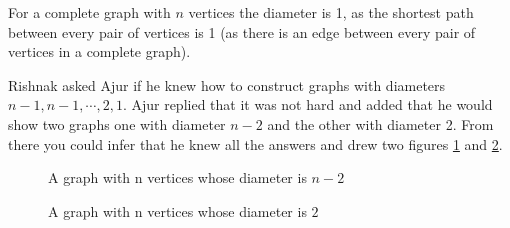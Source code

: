 For a complete graph with $n$ vertices the diameter is 1, as the shortest path between every pair of vertices is 1 (as there is an edge between every pair of vertices in a complete graph). 

Rishnak asked Ajur if he knew how to construct graphs with diameters $n-1, n-1, \cdots, 2, 1$. Ajur replied that it was not hard and added that he would show two graphs one with diameter $n-2$ and the other with diameter 2. From there you could infer that he knew all the answers and drew two figures \ref{12g5} and \ref{12g6}.
\begin{figure}
\begin{center}
\caption{ A graph with n vertices whose diameter is $n-2$ }\label{12g5}
\end{center}
\end{figure}
\begin{figure}
 \begin{center}
\caption{ A graph with n vertices whose diameter is $2$ }\label{12g6}
\end{center}
\end{figure}

